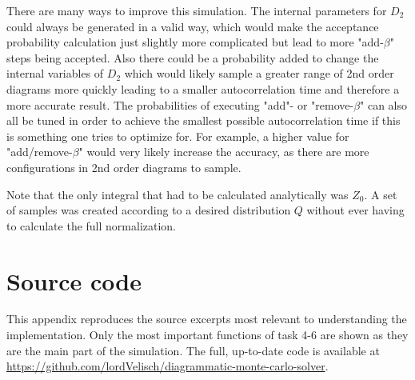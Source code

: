 \documentclass[a4paper, 11pt]{article}          %
\begin{document}
    There are many ways to improve this simulation. The internal parameters for $D_2$ could always be generated in a valid way, which would make the acceptance probability calculation just slightly more complicated but lead to more "add-$\beta$" steps being accepted. Also there could be a probability added to change the internal variables of $D_2$ which would likely sample a greater range of 2nd order diagrams more quickly leading to a smaller autocorrelation time and therefore a more accurate result. The probabilities of executing "add"- or "remove-$\beta$" can also all be tuned in order to achieve the smallest possible autocorrelation time if this is something one tries to optimize for. For example, a higher value for "add/remove-$\beta$" would very likely increase the accuracy, as there are more configurations in 2nd order diagrams to sample.

    Note that the only integral that had to be calculated analytically was $Z_0$. A set of samples was created according to a desired distribution $Q$ without ever having to calculate the full normalization.

    \appendix

    \section{Source code}\label{sec:appendix-code}

    This appendix reproduces the source excerpts most relevant to understanding the implementation. Only the most important functions of task 4-6 are shown as they are the main part of the simulation. The full, up-to-date code is available at
    \url{https://github.com/lordVelisch/diagrammatic-monte-carlo-solver}.
\end{document}
